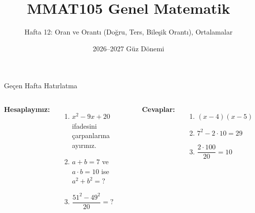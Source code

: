 \documentclass[aspectratio=169,11pt]{beamer}
\title[MMAT105 -- Hafta 12]{MMAT105 Genel Matematik}
\subtitle{Hafta 12: Oran ve Orantı (Doğru, Ters, Bileşik Orantı), Ortalamalar}
\author{}
\date{2026--2027 Güz Dönemi}
\begin{document}
\begin{frame}
\titlepage
\end{frame}


\begin{frame}{Geçen Hafta Hatırlatma}
\begin{columns}[t]
\textbf{Hesaplayınız:}
\begin{enumerate}
\item \(x^2-9x+20\) ifadesini çarpanlarına ayırınız.
\item \(a+b=7\) ve \(a\cdot b=10\) ise \(a^2+b^2=?\)
\item \(\dfrac{51^2-49^2}{20}=?\)
\end{enumerate}
\pause
\textbf{Cevaplar:}
\begin{enumerate}
\item \((x-4)(x-5)\)
\item \(7^2-2\cdot 10=29\)
\item \(\dfrac{2\cdot 100}{20}=10\)
\end{enumerate}
\end{columns}
\end{frame}
\end{document}
